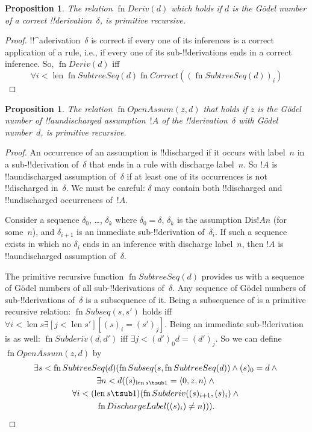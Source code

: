 \documentclass[10pt,a4paper]{article}
\theoremstyle{plain}
\newtheorem{prop}[thm]{Proposition}
\theoremstyle{definition}
\theoremstyle{remark}
\newcommand*{\ollabel}[1]{\label{#1}}
\providecommand{\lexists}{\mathord{\exists}}
\providecommand{\tuple}[1]{\langle #1 \rangle}
\providecommand{\len}{\operatorname{len}}
\providecommand{\bforall}{\forall}
\providecommand{\bexists}{\exists}
\providecommand{\Discharge}{\mathrm{Dis}}
\providecommand{\fn}{\operatorname{fn}}
\providecommand{\fn}{\operatorname{fn}}
\begin{document}
\begin{prop}
  \ollabel{prop:deriv}
  The relation $\fn{Deriv}(d)$ which holds if $d$ is the G\"odel
  number of a correct !!{derivation}~$\delta$, is primitive recursive.
\end{prop}

\begin{proof}
  !!^a{derivation}~$\delta$ is correct if every one of its inferences
  is a correct application of a rule, i.e., if every one of its
  sub-!!{derivation}s ends in a correct inference. So, $\fn{Deriv}(d)$
  iff
  \[
  \bforall{i<\len{\fn{SubtreeSeq}(d)}}{\fn{Correct}((\fn{SubtreeSeq}(d))_i)}
  \]
\end{proof}

\begin{prop}
  \ollabel{prop:openassum} The relation $\fn{OpenAssum}(z, d)$ that
  holds if $z$ is the G\"odel number of !!a{undischarged} assumption~$!A$
  of the !!{derivation}~$\delta$ with G\"odel number~$d$, is primitive
  recursive.
\end{prop}

\begin{proof}
  An occurrence of an assumption is !!{discharged} if it occurs with
  label~$n$ in a sub-!!{derivation} of~$\delta$ that ends in a rule
  with discharge label~$n$. So $!A$ is !!a{undischarged} assumption
  of~$\delta$ if at least one of its occurrences is not !!{discharged}
  in~$\delta$. We must be careful: $\delta$ may contain both
  !!{discharged} and !!{undischarged} occurrences of~$!A$.

  Consider a sequence $\delta_0$, \dots, $\delta_k$ where $\delta_0 =
  \delta$, $\delta_k$ is the assumption $\Discharge{!A}{n}$
  (for some~$n$), and $\delta_{i+1}$ is an immediate sub-!!{derivation}
  of~$\delta_i$. If such a sequence exists in which no $\delta_i$
  ends in an inference with discharge label~$n$, then $!A$ is
  !!a{undischarged} assumption of~$\delta$.

  The primitive recursive function $\fn{SubtreeSeq}(d)$ provides us
  with a sequence of G\"odel numbers of all sub-!!{derivation}s
  of~$\delta$. Any sequence of G\"odel numbers of sub-!!{derivation}s
  of~$\delta$ is a subsequence of it. Being a subsequence of is a
  primitive recursive relation: $\fn{Subseq}(s, s')$ holds iff
  $\bforall{i<\len{s}}{\lexists[j<\len{s'}][(s)_i = (s')_j]}$. Being an
  immediate sub-!!{derivation} is as well: $\fn{Subderiv}(d, d')$ iff
  $\bexists{j<(d')_0}{d = (d')_j}$. So we can define
  $\fn{OpenAssum}(z, d)$ by
  \begin{multline*}
    \bexists{s<\fn{SubtreeSeq}(d)}{(\fn{Subseq}(s, \fn{SubtreeSeq}(d))
      \land (s)_0 = d \land {}} \\
    \bexists{n<d}{((s)_{\len{s} \tsub 1} = \tuple{0, z, n} \land {}}\\
      \bforall{i<(\len{s} \tsub 1)}{(\fn{Subderiv}((s)_{i+1}, (s)_i) \land {}}\\
      \fn{DischargeLabel}((s)_i) \neq n))).
  \end{multline*}
\end{proof}
\end{document}
